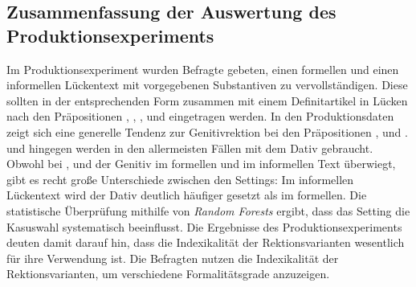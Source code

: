 
\subsection{Zusammenfassung der Auswertung des Produktionsexperiments}
\label{sec:ErgProdZusammenfassung}
Im Produktionsexperiment wurden Befragte gebeten, einen formellen und einen informellen Lückentext mit vorgegebenen Substantiven zu vervollständigen. 
Diese sollten in der entsprechenden Form zusammen mit einem Definitartikel in Lücken nach den Präpositionen \wegen, \waehrend, \dank, \gegenueber{} und  eingetragen werden. 
In den Produktionsdaten zeigt sich eine generelle Tendenz zur Genitivrektion bei den Präpositionen \wegen, \waehrend{} und \dank{}. 
 und  hingegen werden in den allermeisten Fällen mit dem Dativ gebraucht. 
Obwohl bei \wegen, \waehrend{} und \dank{} der Genitiv im formellen und im informellen Text überwiegt, gibt es recht große Unterschiede zwischen den Settings: 
Im informellen Lückentext wird der Dativ deutlich häufiger gesetzt als im formellen. 
Die statistische Überprüfung mithilfe von \textit{Random Forests} ergibt, dass das Setting die Kasuswahl systematisch beeinflusst. 
Die Ergebnisse des Produktionsexperiments deuten damit darauf hin, dass die Indexikalität der Rektionsvarianten wesentlich für ihre Verwendung ist. 
Die Befragten nutzen die Indexikalität der Rektionsvarianten, um verschiedene Formalitätsgrade anzuzeigen. 


